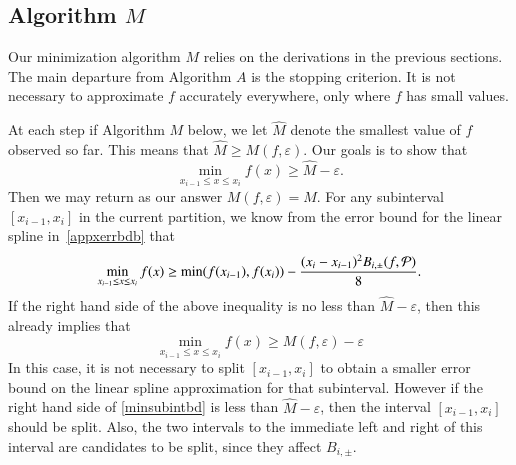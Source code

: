 \documentclass[review]{elsarticle}
\newcommand{\abstol}{\varepsilon}
\theoremstyle{definition}
\newcommand{\hM}{\widehat{M}}
\newcommand{\minfii}{\min(f(x_{i-1}), f(x_i))} %
\begin{document}
\subsection{Algorithm $M$}  \label{sec:minalgo}
Our minimization algorithm $M$ relies on the derivations in the previous sections.  The main departure from Algorithm $A$ is the stopping criterion.  It is not necessary to approximate $f$ accurately everywhere, only where $f$ has small values.

At each step if Algorithm $M$ below, we let $\hM$ denote the smallest value of $f$ observed so far.  This means that $\hM \ge M(f,\abstol)$.  Our goals is to show that
\[
\min_{x_{i-1} \le x \le x_i} f(x) \ge \hM - \abstol.
\]
Then we may return as our answer $M(f,\abstol) = \hM$.
For any subinterval $[x_{i-1}, x_i]$ in the current partition, we know from the error bound for the linear spline
in~\eqref{appxerrbdb} that
\begin{equation} \label{minsubintbd}
\min_{x_{i-1} \le x \le x_i} f(x) \ge \minfii -\frac{(x_i - x_{i-1})^2B_{i,\pm}(f,\cp)}{8}.
\end{equation}
If the right hand side of the above inequality is no less than $\hM - \abstol$, then this already implies that
\[
\min_{x_{i-1} \le x \le x_i} f(x) \ge M(f,\abstol) - \abstol
\]
In this case, it is not necessary to split $[x_{i-1}, x_i]$ to obtain a smaller error bound on the linear spline approximation for that subinterval.  However if the right hand side of \eqref{minsubintbd} is less than $\hM - \abstol$, then the interval $[x_{i-1}, x_i]$ should be split.  Also, the two intervals to the immediate left and right of this interval are candidates to be split, since they affect $B_{i,\pm}$.
\end{document}
